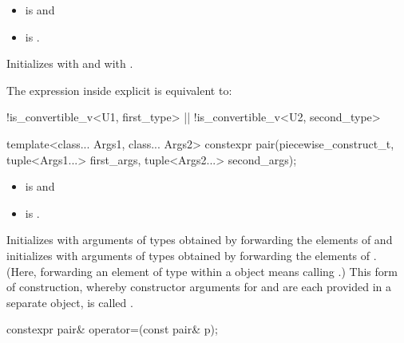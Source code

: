 \begin{itemdescr}
\pnum
\constraints
\begin{itemize}
\item {} is  and
\item {} is .
\end{itemize}

\pnum
\effects
Initializes  with
and  with
.

\pnum
\remarks
The expression inside explicit is equivalent to:
\begin{codeblock}
!is_convertible_v<U1, first_type> || !is_convertible_v<U2, second_type>
\end{codeblock}
\end{itemdescr}

%
\begin{itemdecl}
template<class... Args1, class... Args2>
  constexpr pair(piecewise_construct_t,
                 tuple<Args1...> first_args, tuple<Args2...> second_args);
\end{itemdecl}

\begin{itemdescr}
\pnum
\mandates
\begin{itemize}
\item {} is  and
\item {} is .
\end{itemize}

\pnum
\effects
Initializes  with arguments of types
 obtained by forwarding the elements of 
and initializes  with arguments of types 
obtained by forwarding the elements of . (Here, forwarding
an element  of type  within a  object means calling
.) This form of construction, whereby constructor
arguments for  and  are each provided in a separate
 object, is called .
\end{itemdescr}

%
\begin{itemdecl}
constexpr pair& operator=(const pair& p);
\end{itemdecl}

